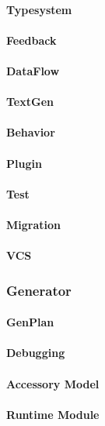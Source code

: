 \paragraph{Typesystem}
\lipsum[5]

\paragraph{Feedback}
\lipsum[5]

\paragraph{DataFlow}
\lipsum[5]

\paragraph{TextGen}
\lipsum[5]

\paragraph{Behavior}
\lipsum[5]

\paragraph{Plugin}
\lipsum[5]

\paragraph{Test}
\lipsum[5]

\paragraph{Migration}
\lipsum[5]

\paragraph{\ac{VCS}}
\lipsum[5]

\subsubsection{Generator}
\lipsum[5]

\paragraph{GenPlan}
\lipsum[5]

\paragraph{Debugging}
\lipsum[5]

\paragraph{Accessory Model}
\lipsum[5]

\paragraph{Runtime Module}
\lipsum[5]
